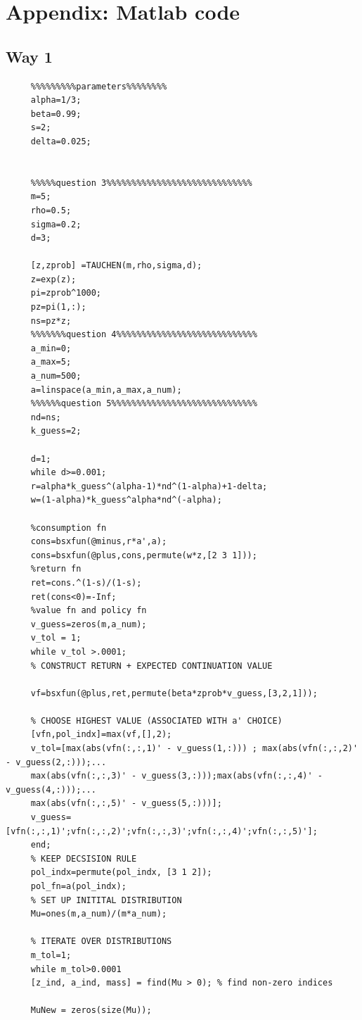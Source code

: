\documentclass[12pt]{article}
\begin{document}
\section{Appendix: Matlab code}
    \subsection{Way 1}
     \begin{verbatim}
     %%%%%%%%%parameters%%%%%%%%
     alpha=1/3;
     beta=0.99;
     s=2;
     delta=0.025;
     
     
     %%%%%question 3%%%%%%%%%%%%%%%%%%%%%%%%%%%%%
     m=5;
     rho=0.5;
     sigma=0.2;
     d=3;
     
     [z,zprob] =TAUCHEN(m,rho,sigma,d);
     z=exp(z);
     pi=zprob^1000;
     pz=pi(1,:);
     ns=pz*z;
     %%%%%%%question 4%%%%%%%%%%%%%%%%%%%%%%%%%%%%
     a_min=0;
     a_max=5;
     a_num=500;
     a=linspace(a_min,a_max,a_num);
     %%%%%%question 5%%%%%%%%%%%%%%%%%%%%%%%%%%%%%
     nd=ns;
     k_guess=2;
     
     d=1;
     while d>=0.001;
     r=alpha*k_guess^(alpha-1)*nd^(1-alpha)+1-delta;
     w=(1-alpha)*k_guess^alpha*nd^(-alpha);
     
     %consumption fn
     cons=bsxfun(@minus,r*a',a);
     cons=bsxfun(@plus,cons,permute(w*z,[2 3 1]));
     %return fn
     ret=cons.^(1-s)/(1-s);
     ret(cons<0)=-Inf;
     %value fn and policy fn
     v_guess=zeros(m,a_num);
     v_tol = 1;
     while v_tol >.0001;
     % CONSTRUCT RETURN + EXPECTED CONTINUATION VALUE
     
     vf=bsxfun(@plus,ret,permute(beta*zprob*v_guess,[3,2,1]));
     
     % CHOOSE HIGHEST VALUE (ASSOCIATED WITH a' CHOICE)
     [vfn,pol_indx]=max(vf,[],2);
     v_tol=[max(abs(vfn(:,:,1)' - v_guess(1,:))) ; max(abs(vfn(:,:,2)' - v_guess(2,:)));...
     max(abs(vfn(:,:,3)' - v_guess(3,:)));max(abs(vfn(:,:,4)' - v_guess(4,:)));...
     max(abs(vfn(:,:,5)' - v_guess(5,:)))];
     v_guess=[vfn(:,:,1)';vfn(:,:,2)';vfn(:,:,3)';vfn(:,:,4)';vfn(:,:,5)'];
     end;
     % KEEP DECSISION RULE
     pol_indx=permute(pol_indx, [3 1 2]);
     pol_fn=a(pol_indx); 
     % SET UP INITITAL DISTRIBUTION
     Mu=ones(m,a_num)/(m*a_num);
     
     % ITERATE OVER DISTRIBUTIONS
     m_tol=1;
     while m_tol>0.0001
     [z_ind, a_ind, mass] = find(Mu > 0); % find non-zero indices
     
     MuNew = zeros(size(Mu));
     

\end{verbatim}
\end{document}
